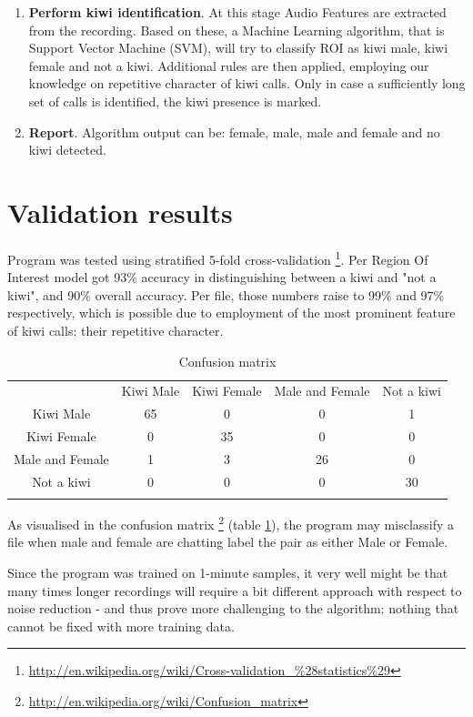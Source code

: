 \documentclass[paper=a4, fontsize=11pt]{scrartcl}	%
\numberwithin{equation}{section}		%
\numberwithin{figure}{section}			%
\numberwithin{table}{section}				%
\begin{document}
\begin{enumerate}
	\item \textbf{Perform kiwi identification}. At this stage Audio Features are extracted from the recording. Based on these, a Machine Learning algorithm, that is Support Vector Machine (SVM), will try to classify ROI as kiwi male, kiwi female and not a kiwi. Additional rules are then applied, employing our knowledge on repetitive character of kiwi calls. Only in case a sufficiently long set of calls is identified, the kiwi presence is marked. 
	\item \textbf{Report}. Algorithm output can be: female, male, male and female and no kiwi detected.
\end{enumerate}

\section{Validation results}
Program was tested using stratified 5-fold cross-validation \footnote{\url{http://en.wikipedia.org/wiki/Cross-validation_\%28statistics\%29}}. Per Region Of Interest model got 93\% accuracy in distinguishing between a kiwi and "not a kiwi", and 90\% overall accuracy. Per file, those numbers raise to 99\% and 97\% respectively, which is possible due to employment of the most prominent feature of kiwi calls: their repetitive character. 

\begin{table}[hp]
\label{tab:confusion}
\caption{Confusion matrix}
\begin{tabularx}{.7\textwidth}{c|c c c c |}
 & Kiwi Male & Kiwi Female & Male and Female & \multicolumn{1}{c}{Not a kiwi} \\
\hhline{-----}
Kiwi Male & 65 \cellcolor[gray]{.8}& 0 & 0 & 1 \\
Kiwi Female & 0 & 35 \cellcolor[gray]{.8}& 0 & 0 \\
Male and Female & 1 & 3 & 26 \cellcolor[gray]{.8} & 0 \\
Not a kiwi & 0 & 0 & 0 & 30 \cellcolor[gray]{.8} \\
\hhline{~----}
\end{tabularx}
\end{table}

As visualised in the confusion matrix \footnote{\url{http://en.wikipedia.org/wiki/Confusion_matrix}} (table \ref{tab:confusion}), the program may misclassify a file when male and female are chatting label the pair as either Male or Female.

Since the program was trained on 1-minute samples, it very well might be that many times longer recordings will require a bit different approach with respect to noise reduction - and thus prove more challenging to the algorithm; nothing that cannot be fixed with more training data.
\end{document}
